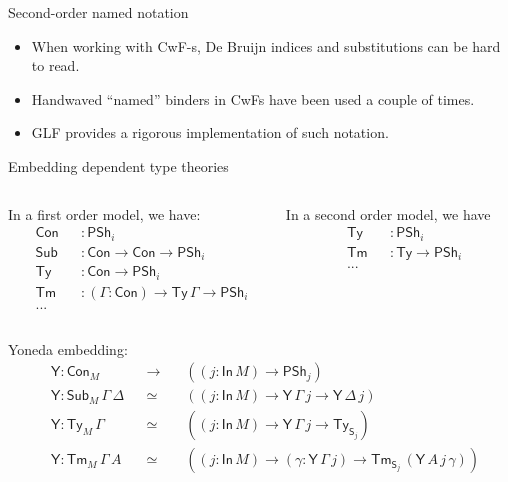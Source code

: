 \documentclass[dvipsnames,aspectratio=169]{beamer}
\newcommand{\Con}{\mathsf{Con}}
\newcommand{\Sub}{\mathsf{Sub}}
\newcommand{\Tm}{\mathsf{Tm}}
\newcommand{\Ty}{\mathsf{Ty}}
\newcommand{\Y}{\mathsf{Y}}
\newcommand{\In}{\mathsf{In}}
\newcommand{\PSh}{\mathsf{PSh}}
\renewcommand{\S}{\mathsf{S}}
\begin{document}
\begin{frame}{Second-order named notation}
  \begin{itemize}
  \item When working with CwF-s, De Bruijn indices and substitutions
        can be hard to read.
  \item Handwaved ``named'' binders in CwFs have been used a couple of times.
  \item GLF provides a rigorous implementation of such notation.
  \end{itemize}
\end{frame}

\begin{frame}{Embedding dependent type theories}

\begin{columns}
\begin{column}{0.5\textwidth}
In a first order model, we have:
\begin{alignat*}{3}
  &\Con &&: \PSh_i \\
  &\Sub &&: \Con \to \Con \to \PSh_i \\
  &\Ty  &&: \Con \to \PSh_i \\
  &\Tm  &&: (\Gamma : \Con) \to \Ty\,\Gamma \to \PSh_i \\
  & ... &&
\end{alignat*}
\end{column}
\begin{column}{0.5\textwidth}
In a second order model, we have
\begin{alignat*}{3}
  &\Ty  &&: \PSh_i \\
  &\Tm  &&: \Ty \to \PSh_i \\
  & ... && \\
  & && \\
  & &&
\end{alignat*}
\end{column}
\end{columns}
\vspace{0.5em}
\pause
Yoneda embedding:
\begin{alignat*}{4}
  & \Y : \Con_M &&\to\,&&((j : \In\,M) \to \PSh_j) \\
  & \Y : \Sub_M\,\Gamma\,\Delta &&\simeq &&((j : \In\,M) \to \Y\,\Gamma\,j \to \Y\,\Delta\,j) \\
  & \Y : \Ty_M\,\Gamma &&\simeq &&((j : \In\,M) \to \Y\,\Gamma\,j \to \Ty_{\S_j})\\
  & \Y : \Tm_M\,\Gamma\,A &&\simeq &&((j : \In\,M) \to (\gamma : \Y\,\Gamma\,j) \to \Tm_{\S_j}\,(\Y\,A\,j\,\gamma))
\end{alignat*}

\end{frame}
\end{document}
